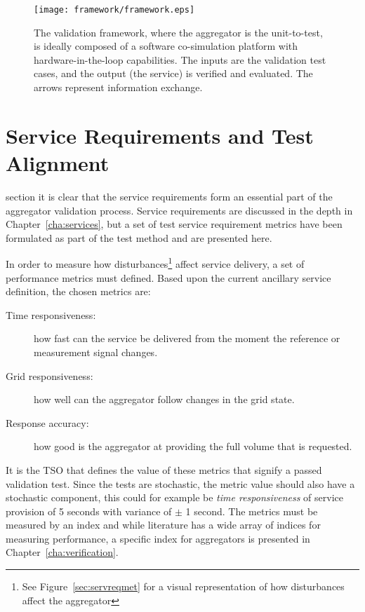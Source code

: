 \begin{figure}[ht]
	\centering
	\caption{The validation framework, where the aggregator is the unit-to-test, is ideally composed of a software co-simulation platform with hardware-in-the-loop capabilities. The inputs are the validation test cases, and the output (\ie the service) is verified and evaluated. The arrows represent information exchange.}
	\texttt{[image: framework/framework.eps]}\label{fig:frameworkbig}
\end{figure}

\section{Service Requirements and Test Alignment} 
 section it is clear that the service requirements form an essential part of the aggregator validation process. Service requirements are discussed in the depth in Chapter~\ref{cha:services}, but a set of test service requirement metrics have been formulated as part of the test method and are presented here.


In order to measure how disturbances\footnote{See Figure~\ref{sec:servreqmet} for a visual representation of how disturbances affect the aggregator} affect service delivery, a set of performance metrics must defined. Based upon the current ancillary service definition, the chosen metrics are:
\begin{description}
	\item[Time responsiveness:] how fast can the service be delivered from the moment the reference or measurement signal changes.
	\item[Grid responsiveness:] how well can the aggregator follow changes in the grid state.
	\item[Response accuracy:] how good is the aggregator at providing the full volume that is requested.
\end{description}

It is the TSO that defines the value of these metrics that signify a passed validation test. Since the tests are stochastic, the metric value should also have a stochastic component, this could for example be \emph{time responsiveness} of service provision of 5 seconds with variance of $\pm$ 1 second. The metrics must be measured by an index and while literature has a wide array of indices for measuring performance, a specific index for aggregators is presented in Chapter~\ref{cha:verification}.

